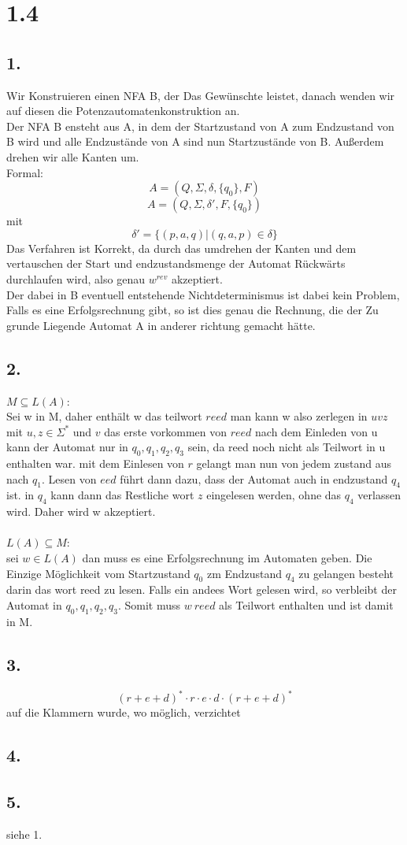 \documentclass[12pt,a4paper]{article}
\begin{document}
\section*{1.4}
\subsection*{1.}
Wir Konstruieren einen NFA B, der Das Gewünschte leistet, danach wenden wir auf diesen die Potenzautomatenkonstruktion an.\\
Der NFA B ensteht aus A, in dem der Startzustand von A zum Endzustand von B wird und alle Endzustände von A sind nun Startzustände von B. Außerdem drehen wir alle Kanten um.\\
Formal:\\
\[A=(Q,\Sigma,\delta,\{q_0\},F)\]
\[A=(Q,\Sigma,\delta',F,\{q_0\})\]
mit \[\delta' = \{(p,a,q)|(q,a,p)\in \delta\}\]
Das Verfahren ist Korrekt, da durch das umdrehen der Kanten und dem vertauschen der Start und endzustandsmenge der Automat Rückwärts durchlaufen wird, also genau $w^{rev}$ akzeptiert.\\
Der dabei in B eventuell entstehende Nichtdeterminismus ist dabei kein Problem, Falls es eine Erfolgsrechnung gibt, so ist dies genau die Rechnung, die der Zu grunde Liegende Automat A in anderer richtung gemacht hätte.
\subsection*{2.}
$M\subseteq L(A)$:\\
Sei w in M, daher enthält w das teilwort $reed$ man kann w also zerlegen in $uvz$ mit $u,z\in \Sigma^*$ und $v$ das erste vorkommen von $reed$  nach dem Einleden von u kann der Automat nur in $q_0, q_1,q_2,q_3$ sein, da reed noch nicht als Teilwort in u enthalten war. mit dem Einlesen von $r$ gelangt man nun von jedem zustand aus nach $q_1$. Lesen von $eed$ führt dann dazu, dass der Automat auch in endzustand $q_4$ ist. in $q_4$ kann dann das Restliche wort $z$ eingelesen werden, ohne das $q_4$ verlassen wird. Daher wird w akzeptiert.\\
\\
$L(A)\subseteq M$:\\
sei $w \in L(A)$ dan muss es eine Erfolgsrechnung im Automaten geben. Die Einzige Möglichkeit vom Startzustand $q_0$ zm Endzustand $q_4$ zu gelangen besteht darin das wort reed zu lesen. Falls ein andees Wort gelesen wird, so verbleibt der Automat in $q_0, q_1,q_2,q_3$. Somit muss $w\ reed$ als Teilwort enthalten und ist damit in M.
\subsection*{3.}
\[(r+e+d)^*\cdot r\cdot e\cdot d\cdot(r+e+d)^*\]
auf die Klammern wurde, wo möglich, verzichtet
\subsection*{4.}

\subsection*{5.}
siehe 1.
\end{document}
